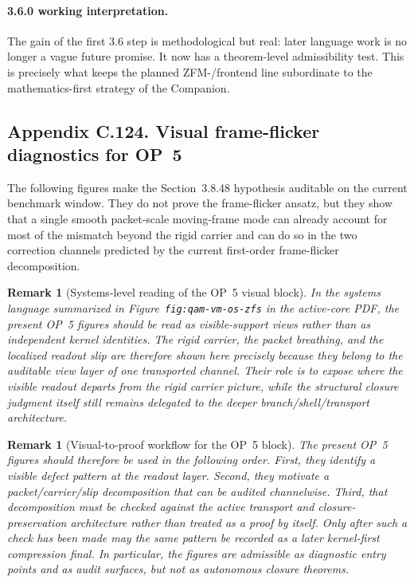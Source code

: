 \documentclass[12pt,a4paper]{article}
\newtheorem{remark}[theorem]{Remark}
\begin{document}
\paragraph{3.6.0 working interpretation.}
The gain of the first 3.6 step is methodological but real: later language work is no longer a vague future promise. It now has a theorem-level admissibility test. This is precisely what keeps the planned ZFM-/frontend line subordinate to the mathematics-first strategy of the Companion.


\clearpage
\subsection*{Appendix C.124. Visual frame-flicker diagnostics for OP~5}
The following figures make the Section~3.8.48 hypothesis auditable on the current benchmark window. They do not prove the frame-flicker ansatz, but they show that a single smooth packet-scale moving-frame mode can already account for most of the mismatch beyond the rigid carrier and can do so in the two correction channels predicted by the current first-order frame-flicker decomposition.

\begin{remark}[Systems-level reading of the OP~5 visual block]\label{rem:appendixC-op5-systems-reading}
In the systems language summarized in Figure~\texttt{fig:qam-vm-os-zfs} in the active-core PDF, the present OP~5 figures should be read as visible-support views rather than as independent kernel identities. The rigid carrier, the packet breathing, and the localized readout slip are therefore shown here precisely because they belong to the auditable view layer of one transported channel. Their role is to expose where the visible readout departs from the rigid carrier picture, while the structural closure judgment itself still remains delegated to the deeper branch/shell/transport architecture.
\end{remark}


\begin{remark}[Visual-to-proof workflow for the OP~5 block]\label{rem:appendixC-op5-visual-workflow}
The present OP~5 figures should therefore be used in the following order. First, they identify a visible defect pattern at the readout layer. Second, they motivate a packet/carrier/slip decomposition that can be audited channelwise. Third, that decomposition must be checked against the active transport and closure-preservation architecture rather than treated as a proof by itself. Only after such a check has been made may the same pattern be recorded as a later kernel-first compression final. In particular, the figures are admissible as \emph{diagnostic entry points} and as \emph{audit surfaces}, but not as autonomous closure theorems.
\end{remark}
\end{document}

